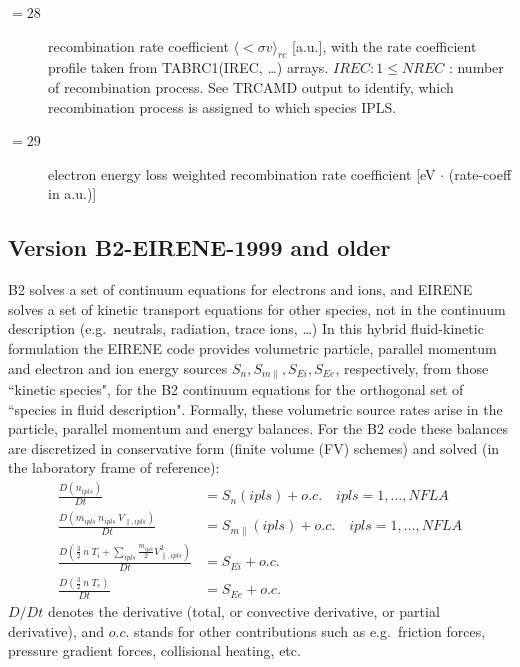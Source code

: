 \begin{description}
\begin{description}
          \item[$= 28$]
                recombination rate coefficient $\langle<\sigma v\rangle_{rc}$ [a.u.], with the
                rate coefficient profile taken from TABRC1(IREC, \dots) arrays.
                $IREC: 1 \le NREC$ : number of recombination process.
                See TRCAMD output to identify, which recombination process is assigned to which
                species IPLS.
          \item[$= 29$] electron energy loss weighted recombination rate coefficient
                  [\si{\electronvolt} $\cdot$ (rate-coeff in a.u.)]
        \end{description}
\end{description}

\subsection{Version B2-EIRENE-1999 and older} \label{sec2.14.1}

B2 solves a set of continuum equations for electrons and ions, and EIRENE
solves a set of kinetic transport equations for other species, not in the
continuum description (e.g.\ neutrals, radiation, trace ions, \dots) In this
hybrid fluid-kinetic formulation the EIRENE code provides volumetric particle,
parallel momentum and electron and ion energy sources $S_n, S_{m\parallel},
  S_{Ei}, S_{Ee}$, respectively, from those ``kinetic species", for the B2
continuum equations for the orthogonal set of ``species in fluid description".
Formally, these volumetric source rates arise in the particle, parallel
momentum and energy balances.
For the B2 code these balances are discretized in conservative form (finite
volume (FV) schemes) and solved (in the laboratory frame of reference):
\begin{align}
  \frac{D(n_{ipls})}{Dt}                                     & = S_n(ipls) +
  o.c. \quad   ipls = 1, \dots, NFLA                                            \\
  \frac{D ( m_{ipls} \ n_{ipls} \ V_{\parallel,{ipls}})}{Dt} & = S_{m\parallel}
  (ipls) + o.c.
  \quad   ipls = 1, \dots, NFLA
  \\
  \frac{D (\frac32 \ n \ T_i+\sum_{ipls}\frac{m_{ipls}}{2}
  V^2_{\parallel,ipls})}{Dt}                                 & = S_{Ei} + o.c.
  \\
  \frac{D (\frac32 \ n \ T_e)}{Dt}                           & = S_{Ee} + o.c.
\end{align}
$D/Dt$ denotes the derivative (total, or convective derivative, or partial
derivative), and $o.c.
$ stands for other contributions such as e.g.\ friction forces, pressure
gradient forces, collisional heating, etc.

